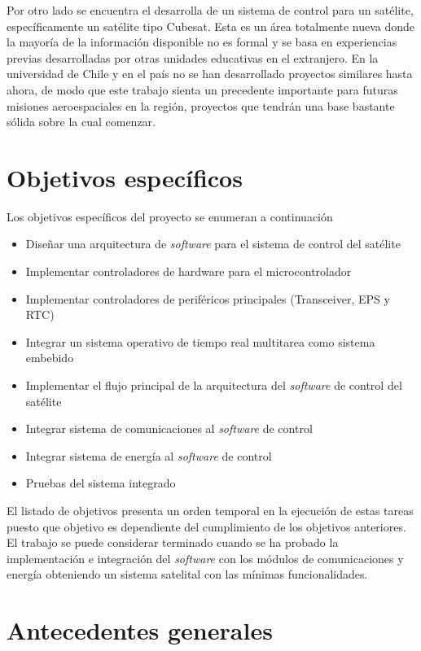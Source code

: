 \documentclass[11pt,letterpaper]{article}
\begin{document}
Por otro lado se encuentra el desarrolla de un sistema de control para un satélite, específicamente un satélite tipo Cubesat. Esta es un área totalmente nueva donde la mayoría de la información disponible no es formal y se basa en experiencias previas desarrolladas por otras unidades educativas en el extranjero. En la universidad de Chile y en el país no se han desarrollado proyectos similares hasta ahora, de modo que este trabajo sienta un precedente importante para futuras misiones aeroespaciales en la región, proyectos que tendrán una base bastante sólida sobre la cual comenzar.


\section{Objetivos específicos}
Los objetivos específicos del proyecto se enumeran a continuación

\begin{itemize}
 \item Diseñar una arquitectura de \textit{software} para el sistema de control del satélite
 \item Implementar controladores de hardware para el microcontrolador
 \item Implementar controladores de periféricos principales (Transceiver, EPS y RTC)
 \item Integrar un sistema operativo de tiempo real multitarea como sistema embebido 
 \item Implementar el flujo principal de la arquitectura del \textit{software} de control del satélite
 \item Integrar sistema de comunicaciones al \textit{software} de control
 \item Integrar sistema de energía al \textit{software} de control
 \item Pruebas del sistema integrado
\end{itemize}

El listado de objetivos presenta un orden temporal en la ejecución de estas tareas puesto que objetivo es dependiente del cumplimiento de los objetivos anteriores. El trabajo se puede considerar terminado cuando se ha probado la implementación e integración del \textit{software} con los módulos de comunicaciones y energía obteniendo un sistema satelital con las mínimas funcionalidades.

\section{Antecedentes generales}
\end{document}
